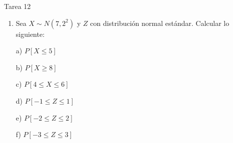 \documentclass[a4paper, 12pt]{article}
\newcommand{\Aspace}{0.2cm}
\begin{document}
    \newpage
    \vspace{0.3cm}

    \begin{center}
        { \LARGE Tarea 12}
    \end{center}

    \begin{enumerate}
        \item Sea $X \sim N(7, 2^{2})$ y $Z$ con distribución normal estándar. Calcular lo siguiente:
            \vspace{\Aspace} \par
            a) $P[X \leq 5]$
            \\ { \color{azul}  }

            \vspace{\Aspace} \par
            b) $P[X \geq 8]$
            \\ { \color{azul}  }

            \vspace{\Aspace} \par
            c) $P[4 \leq X \leq 6]$
            \\ { \color{azul}  }

            \vspace{\Aspace} \par
            d) $P[-1 \leq Z \leq 1]$
            \\ { \color{azul}  }

            \vspace{\Aspace} \par
            e) $P[-2 \leq Z \leq 2]$
            \\ { \color{azul}  }

            \vspace{\Aspace} \par
            f) $P[-3 \leq Z \leq 3]$
            \\ { \color{azul}  }
    \end{enumerate}
\end{document}
